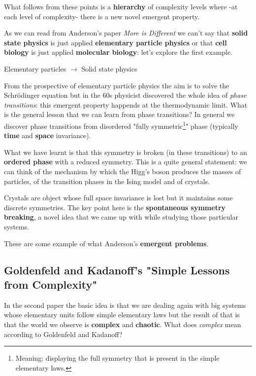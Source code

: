 \documentclass[\main/main.tex]{subfiles}
\begin{document}
What follows from these points is a \textbf{hierarchy} of complexity levels where -at each level of complexity- there is a new novel emergent property.

\medskip

As we can read from Anderson's paper \textit{More is Different} we can't say that \textbf{solid state physics} is just applied \textbf{elementary particle physics} or that \textbf{cell biology} is just applied \textbf{molecular biology}: let's explore the first example.

\par
\begin{center}
    Elementary particles $\to$ Solid state physics
\end{center}

From the prospective of elementary particle physics the aim is to solve the Schr\"{o}dinger equation but in the 60s physicist discovered the whole idea of \textit{phase transitions}: this emergent property happends at the thermodynamic limit.
What is the general lesson that we can learn from phase transitions? In general we discover phase transitions from disordered "fully symmetric\footnote{Meaning: displaying the full symmetry that is present in the simple elementary laws.}" phase (typically \textbf{time} and \textbf{space} invariance).

What we have learnt is that this symmetry is broken (in these transitions) to an \textbf{ordered phase } with a reduced symmetry.
This is a quite general statement: we can think of the mechanism by which the Higg's boson produces the masses of particles, of the transition phases in the Ising model and of crystals.

Crystals are object whose full space invariance is lost but it maintains some discrete symmetries.
The key point here is the \textbf{spontaneous symmetry breaking}, a novel idea that we came up with while studying those particular systems.

These are some example of what Anderson's \textbf{emergent problems}.

\subsection{Goldenfeld and Kadanoff's "Simple Lessons from Complexity"}
In the second paper the basic idea is that we are dealing again with big systems whose elementary units follow simple elementary laws but the result of that is that the world we observe is \textbf{complex} and \textbf{chaotic}.
What does \textit{complex} mean according to Goldenfeld and Kadanoff? \\
\end{document}
